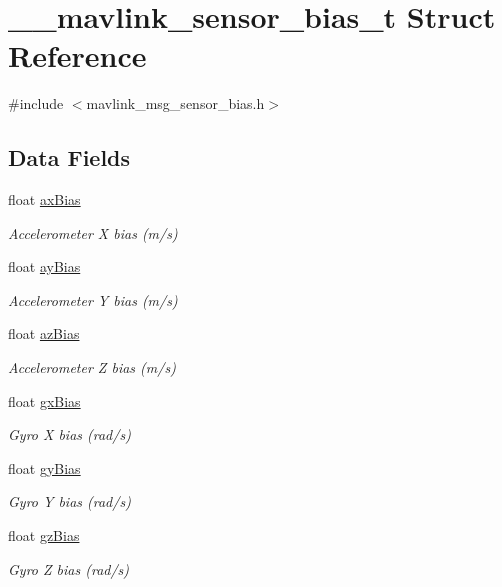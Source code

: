 \hypertarget{struct____mavlink__sensor__bias__t}{\section{\+\_\+\+\_\+mavlink\+\_\+sensor\+\_\+bias\+\_\+t Struct Reference}
\label{struct____mavlink__sensor__bias__t}
}


{\ttfamily \#include $<$mavlink\+\_\+msg\+\_\+sensor\+\_\+bias.\+h$>$}

\subsection*{Data Fields}
\begin{DoxyCompactItemize}
\item 
float \hyperlink{struct____mavlink__sensor__bias__t_a3c422e0cda237661cb2e926cf6bd09ec}{ax\+Bias}
\begin{DoxyCompactList}\small\item\em Accelerometer X bias (m/s) \end{DoxyCompactList}\item 
float \hyperlink{struct____mavlink__sensor__bias__t_a474e1bda43538e23dd964ee33d3aa37c}{ay\+Bias}
\begin{DoxyCompactList}\small\item\em Accelerometer Y bias (m/s) \end{DoxyCompactList}\item 
float \hyperlink{struct____mavlink__sensor__bias__t_a0a776dbd0df22e13fb8b96cae1f1392f}{az\+Bias}
\begin{DoxyCompactList}\small\item\em Accelerometer Z bias (m/s) \end{DoxyCompactList}\item 
float \hyperlink{struct____mavlink__sensor__bias__t_ad312d14ec67a812646702cb1af26e0a5}{gx\+Bias}
\begin{DoxyCompactList}\small\item\em Gyro X bias (rad/s) \end{DoxyCompactList}\item 
float \hyperlink{struct____mavlink__sensor__bias__t_a3c59d214cf6af8a1b0a7cfc38e593995}{gy\+Bias}
\begin{DoxyCompactList}\small\item\em Gyro Y bias (rad/s) \end{DoxyCompactList}\item 
float \hyperlink{struct____mavlink__sensor__bias__t_af1973e90edcb27370fa54d23b6d56b10}{gz\+Bias}
\begin{DoxyCompactList}\small\item\em Gyro Z bias (rad/s) \end{DoxyCompactList}\end{DoxyCompactItemize}


